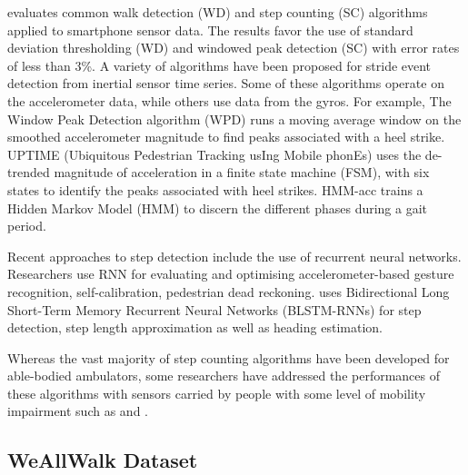 \documentclass[11pt]{article}
\begin{document}
\cite{brajdic2013walk} evaluates common walk detection (WD) and step counting (SC) algorithms applied to smartphone sensor data. The results favor the use of standard deviation thresholding (WD) and windowed peak detection (SC) with error rates of less than 3\%.
A variety of algorithms have been proposed for stride event detection from inertial sensor time series. Some of these algorithms operate on the accelerometer data, while others use data from the gyros. For example, The Window Peak Detection algorithm (WPD) runs a moving average window on the smoothed accelerometer magnitude to find peaks associated with a heel strike. \cite{alzantot2012uptime} UPTIME (Ubiquitous Pedestrian Tracking usIng Mobile phonEs) uses the de-trended magnitude of acceleration in a finite state machine (FSM), with six states to identify the peaks associated with heel strikes. \cite{mannini2011hidden} HMM-acc trains a Hidden Markov Model (HMM) to discern the different phases during a gait period. 


Recent approaches to step detection include the use of recurrent neural networks. Researchers use RNN for evaluating and optimising accelerometer-based gesture recognition, self-calibration, pedestrian dead reckoning.
\cite{edel2015advanced} uses Bidirectional Long Short-Term Memory Recurrent Neural Networks (BLSTM-RNNs) for step detection, step length approximation as well as heading estimation.

Whereas the vast majority of step counting algorithms have been developed for able-bodied ambulators, some researchers have addressed the performances of these algorithms with sensors carried by people with some level of mobility impairment such as \cite{haegele2015validation} and \cite{holbrook2011validation}. 



\subsection{WeAllWalk Dataset}
\end{document}
